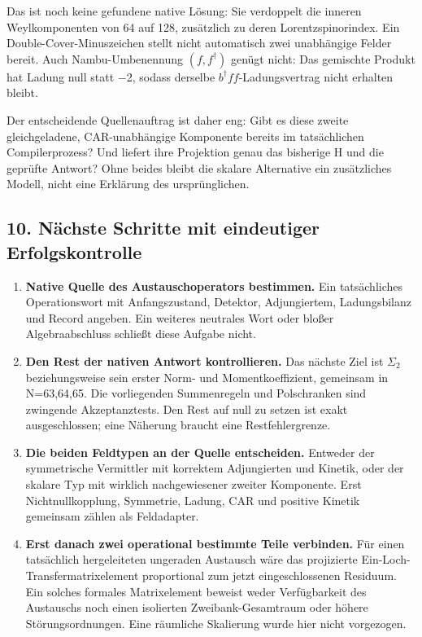 Das ist noch keine gefundene native Lösung: Sie verdoppelt die inneren
Weylkomponenten von 64 auf 128, zusätzlich zu deren Lorentzspinorindex.
Ein Double-Cover-Minuszeichen stellt nicht automatisch zwei unabhängige
Felder bereit. Auch Nambu-Umbenennung \((f,f^\dagger)\) genügt nicht:
Das gemischte Produkt hat Ladung null statt −2, sodass derselbe
\(b^\dagger ff\)-Ladungsvertrag nicht erhalten bleibt.

Der entscheidende Quellenauftrag ist daher eng: Gibt es diese zweite
gleichgeladene, CAR-unabhängige Komponente bereits im tatsächlichen
Compilerprozess? Und liefert ihre Projektion genau das bisherige H und
die geprüfte Antwort? Ohne beides bleibt die skalare Alternative ein
zusätzliches Modell, nicht eine Erklärung des ursprünglichen.

\subsection{10. Nächste Schritte mit eindeutiger
Erfolgskontrolle}\label{nuxe4chste-schritte-mit-eindeutiger-erfolgskontrolle}

\begin{enumerate}
\def\labelenumi{\arabic{enumi}.}
\tightlist
\item
  \textbf{Native Quelle des Austauschoperators bestimmen.} Ein
  tatsächliches Operationswort mit Anfangszustand, Detektor,
  Adjungiertem, Ladungsbilanz und Record angeben. Ein weiteres neutrales
  Wort oder bloßer Algebraabschluss schließt diese Aufgabe nicht.
\item
  \textbf{Den Rest der nativen Antwort kontrollieren.} Das nächste Ziel
  ist \(\Sigma_2\) beziehungsweise sein erster Norm- und
  Momentkoeffizient, gemeinsam in N=63,64,65. Die vorliegenden
  Summenregeln und Polschranken sind zwingende Akzeptanztests. Den Rest
  auf null zu setzen ist exakt ausgeschlossen; eine Näherung braucht
  eine Restfehlergrenze.
\item
  \textbf{Die beiden Feldtypen an der Quelle entscheiden.} Entweder der
  symmetrische Vermittler mit korrektem Adjungierten und Kinetik, oder
  der skalare Typ mit wirklich nachgewiesener zweiter Komponente. Erst
  Nichtnullkopplung, Symmetrie, Ladung, CAR und positive Kinetik
  gemeinsam zählen als Feldadapter.
\item
  \textbf{Erst danach zwei operational bestimmte Teile verbinden.} Für
  einen tatsächlich hergeleiteten ungeraden Austausch wäre das
  projizierte Ein-Loch-Transfermatrixelement proportional zum jetzt
  eingeschlossenen Residuum. Ein solches formales Matrixelement beweist
  weder Verfügbarkeit des Austauschs noch einen isolierten
  Zweibank-Gesamtraum oder höhere Störungsordnungen. Eine räumliche
  Skalierung wurde hier nicht vorgezogen.
\end{enumerate}


